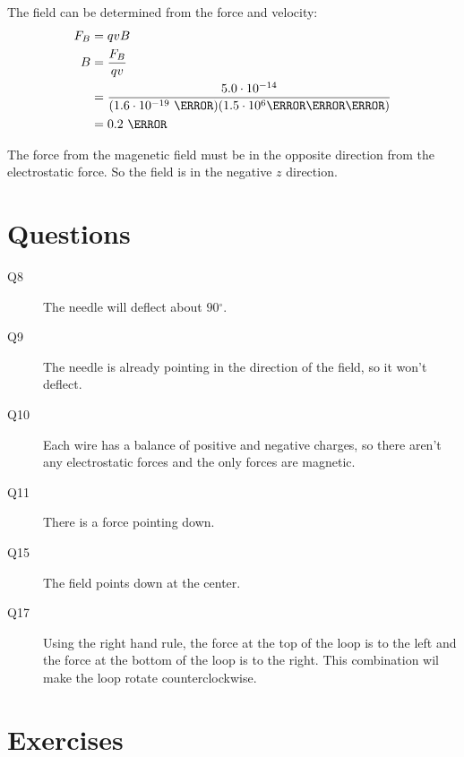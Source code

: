 \documentclass{exam}
\newcommand{\degree}{\ensuremath{^\circ}}
\begin{document}
\begin{questions}
\begin{solution}
The field can be determined from the force and velocity:
\begin{align*}
  F_{B} &= qvB \\
  B &= \frac{F_{B}}{qv} \\
    &= \frac{5.0 \cdot 10^{-14}}{(1.6 \cdot 10^{-19} \ \coulomb)(1.5 \cdot 10^6 \meter \per \second)} \\
    &= 0.2 \ \tesla \\
\end{align*}

The force from the magenetic field must be in the opposite direction from the electrostatic force.  So the field is in the negative $z$ direction.


\end{solution}

\end{questions}

\ifprintanswers

\section{Questions}

\begin{description}

\item[Q8]
The needle will deflect about $90 \degree$.

\item[Q9]
The needle is already pointing in the direction of the field, so it won't deflect.

\item[Q10]
Each wire has a balance of positive and negative charges, so there aren't any electrostatic forces and the only
forces are magnetic.

\item[Q11]
There is a force pointing down.

\item[Q15]
The field points down at the center.

\item[Q17]
Using the right hand rule, the force at the top of the loop is to the left and the force at the bottom of the loop is to
the right.  This combination wil make the loop rotate counterclockwise.

\end{description}

\section{Exercises}
\end{document}
